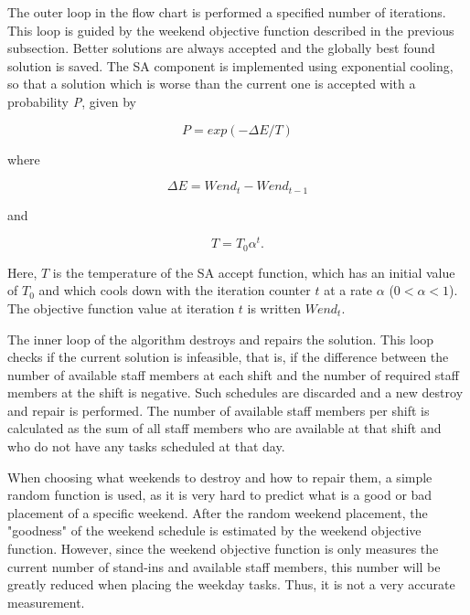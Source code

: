 The outer loop in the flow chart is performed a specified number of iterations. This loop is guided by the weekend objective function described in the previous subsection. Better solutions are always accepted and the globally best found solution is saved. The SA component is implemented using exponential cooling, so that a solution which is worse than the current one is accepted with a probability \textit{P}, given by

\begin{equation}
P = exp(-\Delta E/T)
\label{eq0}
\end{equation}

\noindent
where

\begin{equation}
\Delta E = Wend_t - Wend_{t-1}
\label{eq1}
\end{equation}

\noindent
and

\begin{equation}
T = T_0 \alpha^t.
\label{eq2}
\end{equation}

Here, $T$ is the temperature of the SA accept function, which has an initial value of $T_0$ and which cools down with the iteration counter $t$ at a rate $\alpha$ ($0 < \alpha < 1$). The objective function value at iteration $t$ is written $Wend_t$.


The inner loop of the algorithm destroys and repairs the solution. This loop checks if the current solution is infeasible, that is, if the difference between the number of available staff members at each shift and the number of required staff members at the shift is negative. Such schedules are discarded and a new destroy and repair is performed. The number of available staff members per shift is calculated as the sum of all staff members who are available at that shift and who do not have any tasks scheduled at that day.

When choosing what weekends to destroy and how to repair them, a simple random function is used, as it is very hard to predict what is a good or bad placement of a specific weekend. After the random weekend placement, the "goodness" of the weekend schedule is estimated by the weekend objective function. However, since the weekend objective function is only measures the current number of stand-ins and available staff members, this number will be greatly reduced when placing the weekday tasks. Thus, it is not a very accurate measurement. 


